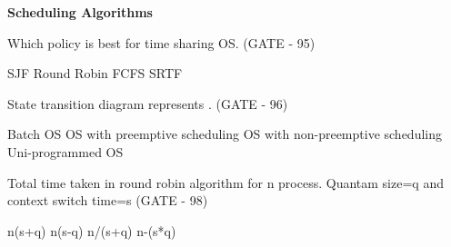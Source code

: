 
\centerline{\textbf{ \LARGE Scheduling Algorithms}}



\begin{minipage}{\linewidth}

\question Which policy is best for time sharing OS. (GATE - 95)

\begin{oneparchoices}
   \choice SJF
   \choice Round Robin
   \choice FCFS
   \choice SRTF
\end{oneparchoices}

  \end{minipage}

\vspace{0.08in}


\begin{minipage}{\linewidth}


\question State transition diagram represents . (GATE - 96)
\begin{choices}
   \choice Batch OS
   \choice OS with preemptive scheduling
   \choice OS with non-preemptive scheduling
   \choice Uni-programmed OS
\end{choices}


  \end{minipage}

\vspace{0.08in}



\begin{minipage}{\linewidth}

\question Total time taken in round robin algorithm for n process. Quantam size=q and context switch time=s  (GATE - 98)


\begin{oneparchoices}
   \choice n(s+q)
   \choice n(s-q)
   \choice n/(s+q)
   \choice n-(s*q)
\end{oneparchoices}


  \end{minipage}

\vspace{0.08in}


